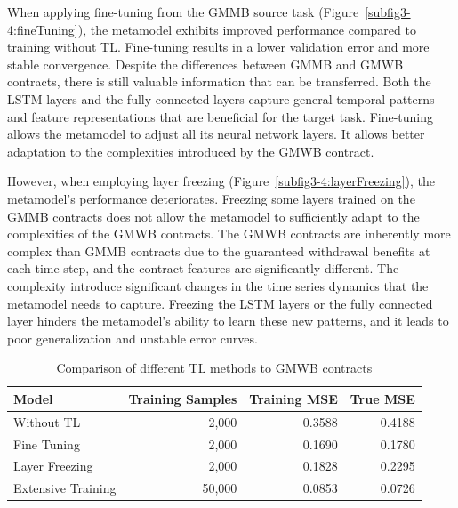 When applying fine-tuning from the GMMB source task (Figure~\ref{subfig3-4:fineTuning}), the metamodel exhibits improved performance compared to training without TL. 
Fine-tuning results in a lower validation error and more stable convergence.
Despite the differences between GMMB and GMWB contracts, there is still valuable information that can be transferred. 
Both the LSTM layers and the fully connected layers capture general temporal patterns and feature representations that are beneficial for the target task. 
Fine-tuning allows the metamodel to adjust all its neural network layers. 
It allows better adaptation to the complexities introduced by the GMWB contract.

However, when employing layer freezing (Figure~\ref{subfig3-4:layerFreezing}), the metamodel's performance deteriorates.
Freezing some layers trained on the GMMB contracts does not allow the metamodel to sufficiently adapt to the complexities of the GMWB contracts. 
The GMWB contracts are inherently more complex than GMMB contracts due to the guaranteed withdrawal benefits at each time step, and the contract features are significantly different.
The complexity introduce significant changes in the time series dynamics that the metamodel needs to capture.
Freezing the LSTM layers or the fully connected layer hinders the metamodel's ability to learn these new patterns, and it leads to poor generalization and unstable error curves.

\begin{table}[ht!]
    \centering
    \begin{tabular}{lrrr}
        \toprule
        \textbf{Model} & \textbf{Training Samples} & \textbf{Training MSE} & \textbf{True MSE} \\
        \midrule
        Without TL & 2,000 & 0.3588 & 0.4188 \\
        Fine Tuning & 2,000 & 0.1690 & 0.1780 \\
        Layer Freezing & 2,000 & 0.1828 & 0.2295 \\
        Extensive Training & 50,000 & 0.0853 & 0.0726 \\
        \bottomrule
    \end{tabular}
    \caption{Comparison of different TL methods to GMWB contracts}
    \label{tab3:transfer_learning_results_gmwb}
\end{table}

